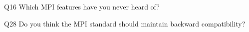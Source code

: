 \begin{description}%
\item{Q16} Which MPI features have you never heard of?%
\item{Q28} Do you think the MPI standard should maintain backward compatibility?%
\end{description}%
